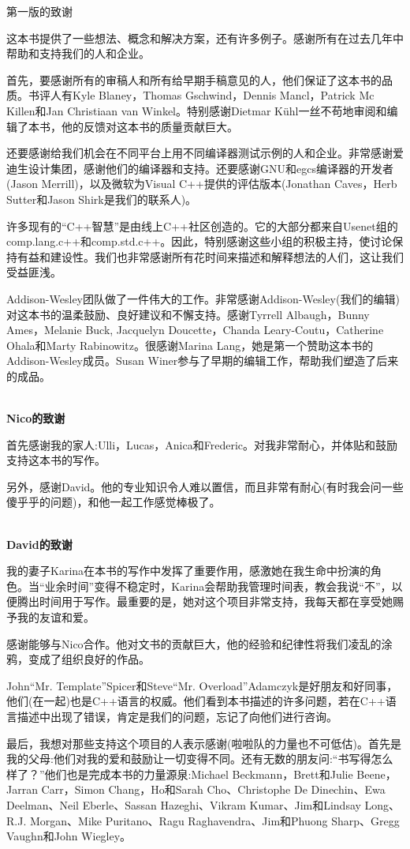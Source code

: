 \begin{flushright}
 第一版的致谢
\end{flushright}

这本书提供了一些想法、概念和解决方案，还有许多例子。感谢所有在过去几年中帮助和支持我们的人和企业。

首先，要感谢所有的审稿人和所有给早期手稿意见的人，他们保证了这本书的品质。书评人有Kyle Blaney，Thomas Gschwind，Dennis Mancl，Patrick Mc Killen和Jan Christiaan van Winkel。特别感谢Dietmar K{\"u}hl一丝不苟地审阅和编辑了本书，他的反馈对这本书的质量贡献巨大。

还要感谢给我们机会在不同平台上用不同编译器测试示例的人和企业。非常感谢爱迪生设计集团，感谢他们的编译器和支持。还要感谢GNU和egcs编译器的开发者(Jason Merrill)，以及微软为Visual C++提供的评估版本(Jonathan Caves，Herb Sutter和Jason Shirk是我们的联系人)。

许多现有的“C++智慧”是由线上C++社区创造的。它的大部分都来自Usenet组的comp.lang.c++和comp.std.c++。因此，特别感谢这些小组的积极主持，使讨论保持有益和建设性。我们也非常感谢所有花时间来描述和解释想法的人们，这让我们受益匪浅。

Addison-Wesley团队做了一件伟大的工作。非常感谢Addison-Wesley(我们的编辑)对这本书的温柔鼓励、良好建议和不懈支持。感谢Tyrrell Albaugh，Bunny Ames，Melanie Buck, Jacquelyn Doucette，Chanda Leary-Coutu，Catherine Ohala和Marty Rabinowitz。很感谢Marina Lang，她是第一个赞助这本书的Addison-Wesley成员。Susan Winer参与了早期的编辑工作，帮助我们塑造了后来的成品。

\hspace*{\fill} \\ %
\noindent\textbf{Nico的致谢}

首先感谢我的家人:Ulli，Lucas，Anica和Frederic。对我非常耐心，并体贴和鼓励支持这本书的写作。

另外，感谢David。他的专业知识令人难以置信，而且非常有耐心(有时我会问一些傻乎乎的问题)，和他一起工作感觉棒极了。

\hspace*{\fill} \\ %
\noindent\textbf{David的致谢}

我的妻子Karina在本书的写作中发挥了重要作用，感激她在我生命中扮演的角色。当“业余时间”变得不稳定时，Karina会帮助我管理时间表，教会我说“不”，以便腾出时间用于写作。最重要的是，她对这个项目非常支持，我每天都在享受她赐予我的友谊和爱。

感谢能够与Nico合作。他对文书的贡献巨大，他的经验和纪律性将我们凌乱的涂鸦，变成了组织良好的作品。

John“Mr. Template”Spicer和Steve“Mr. Overload”Adamczyk是好朋友和好同事，他们(在一起)也是C++语言的权威。他们看到本书描述的许多问题，若在C++语言描述中出现了错误，肯定是我们的问题，忘记了向他们进行咨询。

最后，我想对那些支持这个项目的人表示感谢(啦啦队的力量也不可低估)。首先是我的父母:他们对我的爱和鼓励让一切变得不同。还有无数的朋友问:“书写得怎么样了？”他们也是完成本书的力量源泉:Michael Beckmann，Brett和Julie Beene，Jarran Carr，Simon Chang，Ho和Sarah Cho、Christophe De Dinechin、Ewa Deelman、Neil Eberle、Sassan Hazeghi、Vikram Kumar、Jim和Lindsay Long、R.J. Morgan、Mike Puritano、Ragu Raghavendra、Jim和Phuong Sharp、Gregg Vaughn和John Wiegley。



